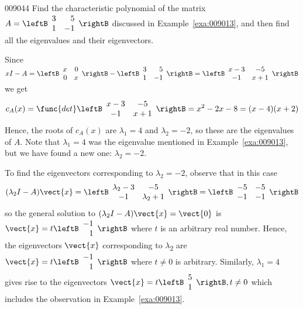 \begin{example}{}{009044}
Find the characteristic polynomial of the matrix $A = \leftB \begin{array}{rr}
3 & 5 \\
1 & -1 
\end{array}\rightB$
 discussed in Example~\ref{exa:009013}, and then find all the eigenvalues and their eigenvectors.


\begin{solution}
  Since $xI-A = \leftB \begin{array}{rr}
x & 0 \\
0 & x 
\end{array}\rightB - \leftB \begin{array}{rr}
3 & 5 \\
1 & -1 
\end{array}\rightB = 
\leftB \begin{array}{cc}
x - 3 & -5 \\
-1 & x+1 
\end{array}\rightB$
 we get
\begin{equation*}
c_A(x) = \func{det} \leftB \begin{array}{cc}
x - 3 & -5 \\
-1 & x+1 
\end{array}\rightB = x^2 - 2x - 8 = (x-4)(x+2)
\end{equation*}
Hence, the roots of $c_{A}(x)$ are $\lambda_{1} = 4$ and $\lambda_{2} = -2$, so these are the eigenvalues of $A$. Note that $\lambda_{1} = 4$ was the eigenvalue mentioned in Example~\ref{exa:009013}, but we have found a new one: $\lambda_{2} = -2$.


To find the eigenvectors corresponding to $\lambda_{2} = -2$, observe that in this case
\begin{equation*}
(\lambda_2 I - A)\vect{x} = \leftB \begin{array}{cc}
\lambda_2 - 3 & -5 \\
-1 & \lambda_2+1
\end{array}\rightB = \leftB \begin{array}{rr}
-5 & -5 \\
-1 & -1
\end{array}\rightB
\end{equation*}
so the general solution to $(\lambda_{2} I - A)\vect{x} = \vect{0}$ is $\vect{x} = t \leftB \begin{array}{r}
-1 \\
1
\end{array}\rightB$
 where $t$ is an arbitrary real number. Hence, the eigenvectors $\vect{x}$ corresponding to $\lambda$\textsubscript{2} are $\vect{x} = t \leftB \begin{array}{r}
-1 \\
1
\end{array}\rightB$
 where $t \neq 0$ is arbitrary. Similarly, $\lambda_{1} = 4$ gives rise to the eigenvectors $\vect{x} = t \leftB \begin{array}{r}
5 \\
1
\end{array}\rightB, t \neq 0$
 which includes the observation in Example~\ref{exa:009013}.
\end{solution}
\end{example}
